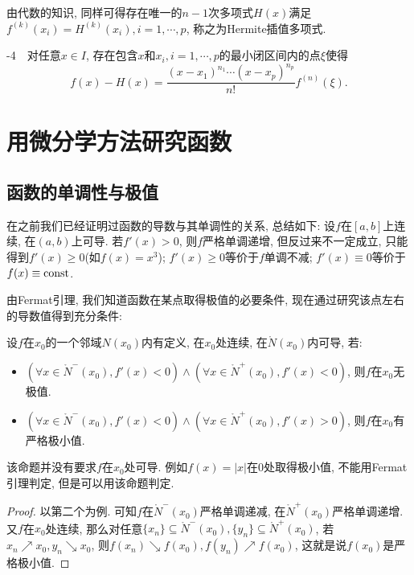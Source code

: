 由代数的知识, 同样可得存在唯一的$n-1$次多项式$H(x)$满足$f^{(k)}(x_i)=H^{(k)}(x_i), i=1,\cdots ,p$, 称之为Hermite插值多项式. 
\vspace{1em}

-4~~对任意$x \in I$, 存在包含$x$和$x_i,i=1,\cdots ,p$的最小闭区间内的点$\xi$使得$$f(x) - H(x) = \frac{(x-x_1)^{n_1} \cdots (x-x_p)^{n_p}}{n!} f^{(n)}(\xi). $$


\newpage
\section{用微分学方法研究函数}

\subsection{函数的单调性与极值}

在之前我们已经证明过函数的导数与其单调性的关系, 总结如下: 设$f$在$[a,b]$上连续, 在$(a,b)$上可导. 若$f'(x)>0$, 则$f$严格单调递增, 但反过来不一定成立, 只能得到$f'(x)\geq 0$(如$f(x)=x^3$); $f'(x) \geq 0$等价于$f$单调不减; $f'(x) \equiv 0$等价于$f(x) \equiv {\rm const}$. 

由Fermat引理, 我们知道函数在某点取得极值的必要条件, 现在通过研究该点左右的导数值得到充分条件: 

\begin{proposition}{}
	设$f$在$x_0$的一个邻域$N(x_0)$内有定义, 在$x_0$处连续, 在$\mathring{N}(x_0)$内可导, 若: 
	\begin{itemize}
		\item $(\forall x \in \mathring{N}^-(x_0), f'(x)<0) \wedge (\forall x \in \mathring{N}^+(x_0), f'(x)<0)$, 则$f$在$x_0$无极值. 
		\item $(\forall x \in \mathring{N}^-(x_0), f'(x)<0) \wedge (\forall x \in \mathring{N}^+(x_0), f'(x)>0)$, 则$f$在$x_0$有严格极小值. 
	\end{itemize}
\end{proposition}
\begin{remark}
	该命题并没有要求$f$在$x_0$处可导. 例如$f(x)=|x|$在$0$处取得极小值, 不能用Fermat引理判定, 但是可以用该命题判定. 
\end{remark}
\begin{proof}
	以第二个为例. 可知$f$在$\mathring{N}^-(x_0)$严格单调递减, 在$\mathring{N}^+(x_0)$严格单调递增. 又$f$在$x_0$处连续, 那么对任意$\{ x_n \} \subseteq \mathring{N}^-(x_0),\{ y_n \} \subseteq \mathring{N}^+(x_0)$, 若$x_n \nearrow x_0, y_n \searrow x_0$, 则$f(x_n) \searrow f(x_0), f(y_n) \nearrow f(x_0)$, 这就是说$f(x_0)$是严格极小值. 
\end{proof}

